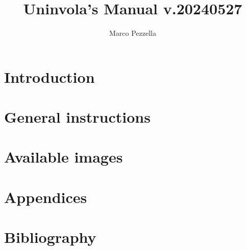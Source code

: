 \documentclass{article}
\title{Uninvola's Manual v.20240527}
\author{Marco Pezzella}
\begin{document}
\maketitle
\part{Introduction}
\newpage
\part{General instructions}

\newpage

\part{Available images }\label{images}


\newpage

\part{Appendices}



\part{Bibliography}


 
\end{document}
